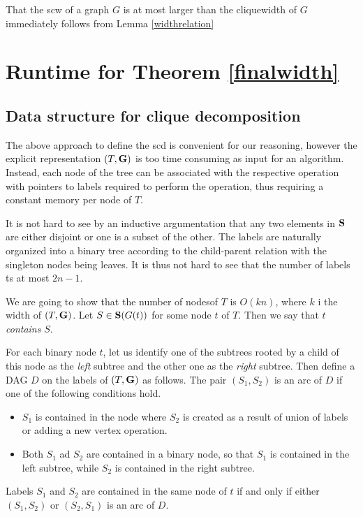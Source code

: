 \documentclass{llncs}
\begin{document}
That the {\sc scw} of a graph $G$ is at most larger than the cliquewidth of $G$ immediately
follows from Lemma \ref{widthrelation} 
\section{Runtime for Theorem \ref{finalwidth}}
\subsection{Data structure for clique decomposition}
The above approach to define the {\sc scd} is convenient for our reasoning, however the explicit
representation $(T,{\bf G})$ is too time consuming as input for an algorithm. Instead, each node
of the tree can be associated with the respective operation with pointers to labels required to
perform the operation, thus requiring a constant memory per node of $T$. 


It is not hard to see by an inductive argumentation that any two elements in ${\bf S}$ are either disjoint or one 
is a subset of the other. The labels are naturally organized into a binary tree according to the child-parent relation
with the singleton nodes being leaves. It is thus not hard to see that the number of labels ts at most $2n-1$.

We are going to show that the number of nodesof $T$ is $O(kn)$, where $k$ i the width of $(T,{\bf G})$.
Let $S \in {\bf S}(G(t))$ for some node $t$ of $T$. Then we say that $t$ \emph{contains}
$S$.

For each binary node $t$, let us identify one of the subtrees rooted by a child of this node 
as the \emph{left} subtree and the other one as the \emph{right} subtree. Then define a DAG $D$ on the
labels of $(T,{\bf G})$ as follows. The pair $(S_1,S_2)$ is an arc of $D$ if one of
the following conditions hold.

\begin{itemize}
\item $S_1$ is contained in the node where $S_2$ is created as a result of union of
labels or adding a new vertex operation.
\item Both $S_1$ ad $S_2$ are contained in a binary node, so that $S_1$ is contained in
the left subtree, while $S_2$ is contained in the right subtree.
\end{itemize}

\begin{lemma} \label{dsize}
Labels $S_1$ and $S_2$ are contained in the same node of $t$ if and only if either
$(S_1,S_2)$ or $(S_2,S_1)$ is an arc of $D$. 
\end{lemma}
\end{document}
